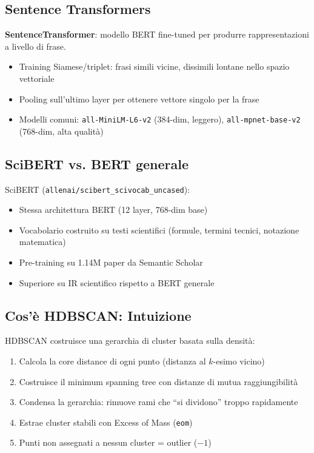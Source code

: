 \documentclass[12pt,a4paper]{article}
\begin{document}
\subsection{Sentence Transformers}

\begin{defbox}
\textbf{SentenceTransformer}: modello BERT fine-tuned per produrre rappresentazioni a livello di frase.
\begin{itemize}
  \item Training Siamese/triplet: frasi simili vicine, dissimili lontane nello spazio vettoriale
  \item Pooling sull'ultimo layer per ottenere vettore singolo per la frase
  \item Modelli comuni: \texttt{all-MiniLM-L6-v2} (384-dim, leggero), \texttt{all-mpnet-base-v2} (768-dim, alta qualit\`a)
\end{itemize}
\end{defbox}

\subsection{SciBERT vs. BERT generale}

SciBERT (\texttt{allenai/scibert\_scivocab\_uncased}):
\begin{itemize}
  \item Stessa architettura BERT (12 layer, 768-dim base)
  \item Vocabolario costruito su testi scientifici (formule, termini tecnici, notazione matematica)
  \item Pre-training su 1.14M paper da Semantic Scholar
  \item Superiore su IR scientifico rispetto a BERT generale
\end{itemize}

\subsection{Cos'\`e HDBSCAN: Intuizione}

HDBSCAN costruisce una gerarchia di cluster basata sulla densit\`a:
\begin{enumerate}
  \item Calcola la core distance di ogni punto (distanza al $k$-esimo vicino)
  \item Costruisce il minimum spanning tree con distanze di mutua raggiungibilit\`a
  \item Condensa la gerarchia: rimuove rami che ``si dividono'' troppo rapidamente
  \item Estrae cluster stabili con Excess of Mass (\texttt{eom})
  \item Punti non assegnati a nessun cluster = outlier ($-1$)
\end{enumerate}
\end{document}
